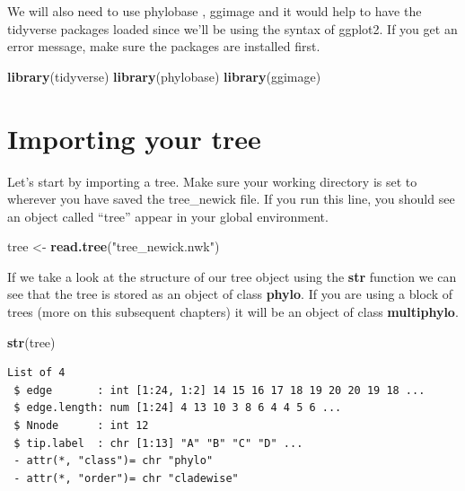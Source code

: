 \documentclass[
]{book}
\newenvironment{Shaded}{\begin{snugshade}}{\end{snugshade}}
\newcommand{\KeywordTok}[1]{\textcolor[rgb]{0.13,0.29,0.53}{\textbf{#1}}}
\newcommand{\NormalTok}[1]{#1}
\newcommand{\StringTok}[1]{\textcolor[rgb]{0.31,0.60,0.02}{#1}}
\begin{document}
We will also need to use phylobase \citep{phylobase}, ggimage \citep{Yu19} and it would help to have the tidyverse packages loaded \citep{Wickham17} since we'll be using the syntax of ggplot2. If you get an error message, make sure the packages are installed first.

\begin{Shaded}
\begin{Highlighting}[]
\KeywordTok{library}\NormalTok{(tidyverse)}
\KeywordTok{library}\NormalTok{(phylobase)}
\KeywordTok{library}\NormalTok{(ggimage)}
\end{Highlighting}
\end{Shaded}

\hypertarget{importing-your-tree}{%
\section{Importing your tree}\label{importing-your-tree}}

Let's start by importing a tree. Make sure your working directory is set to wherever you have saved the tree\_newick file. If you run this line, you should see an object called ``tree'' appear in your global environment.

\begin{Shaded}
\begin{Highlighting}[]
\NormalTok{tree \textless{}{-}}\StringTok{ }\KeywordTok{read.tree}\NormalTok{(}\StringTok{"tree\_newick.nwk"}\NormalTok{)}
\end{Highlighting}
\end{Shaded}

If we take a look at the structure of our tree object using the \textbf{str} function we can see that the tree is stored as an object of class \textbf{phylo}. If you are using a block of trees (more on this subsequent chapters) it will be an object of class \textbf{multiphylo}.

\begin{Shaded}
\begin{Highlighting}[]
\KeywordTok{str}\NormalTok{(tree)}
\end{Highlighting}
\end{Shaded}

\begin{verbatim}
List of 4
 $ edge       : int [1:24, 1:2] 14 15 16 17 18 19 20 20 19 18 ...
 $ edge.length: num [1:24] 4 13 10 3 8 6 4 4 5 6 ...
 $ Nnode      : int 12
 $ tip.label  : chr [1:13] "A" "B" "C" "D" ...
 - attr(*, "class")= chr "phylo"
 - attr(*, "order")= chr "cladewise"
\end{verbatim}
\end{document}
